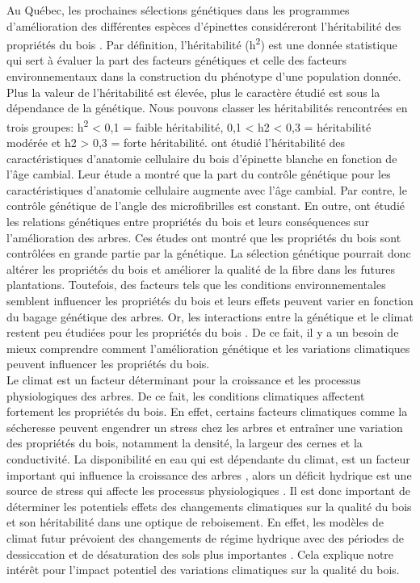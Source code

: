 \documentclass[a4paper,12pt]{report}
\begin{document}
Au Québec, les prochaines sélections génétiques dans les programmes d'amélioration des différentes espèces d'épinettes considéreront l'héritabilité des propriétés du bois \citep{Mullin2011, Beaulieu2009}. Par définition, l'héritabilité (h\textsuperscript{2}) est une donnée statistique qui sert à évaluer la part des facteurs génétiques et celle des facteurs environnementaux dans la construction du phénotype d'une population donnée. Plus la valeur de l'héritabilité est élevée, plus le caractère étudié est sous la dépendance de la génétique. Nous pouvons classer les héritabilités rencontrées en trois groupes: h\textsuperscript{2} < 0,1 = faible héritabilité, 0,1 < h2 < 0,3 = héritabilité modérée et h2 > 0,3 = forte héritabilité. \cite{Lenz2010} ont étudié l'héritabilité des caractéristiques d'anatomie cellulaire du bois d'épinette blanche en fonction de l'âge cambial. Leur étude a montré que la part du contrôle génétique pour les caractéristiques d'anatomie cellulaire augmente avec l'âge cambial. Par contre, le contrôle génétique de l'angle des microfibrilles est constant. En outre, \cite{Lenz2011} ont étudié les relations génétiques entre propriétés du bois et leurs conséquences sur l'amélioration des arbres. Ces études ont montré que les propriétés du bois sont contrôlées en grande partie par la génétique. La sélection génétique pourrait donc altérer les propriétés du bois et améliorer la qualité de la fibre dans les futures plantations. Toutefois, des facteurs tels que les conditions environnementales semblent influencer les propriétés du bois et leurs effets peuvent varier en fonction du bagage génétique des arbres. Or, les interactions entre la génétique et le climat restent peu étudiées pour les propriétés du bois \citep{Housset2018}. De ce fait, il y a un besoin de mieux comprendre comment l'amélioration génétique et les variations climatiques peuvent influencer les propriétés du bois. \\

Le climat est un facteur déterminant pour la croissance et les processus physiologiques des arbres. De ce fait, les conditions climatiques affectent fortement les propriétés du bois. En effet, certains facteurs climatiques comme la sécheresse peuvent engendrer un stress chez les arbres et entraîner une variation des propriétés du bois, notamment la densité, la largeur des cernes et la conductivité. La disponibilité en eau qui est dépendante du climat, est un facteur important qui influence la croissance des arbres \citep{Lebourgeois2005}, alors un déficit hydrique est une source de stress qui affecte les processus physiologiques \citep{Waring1987}. Il est donc important de déterminer les potentiels effets des changements climatiques sur la qualité du bois et son héritabilité dans une optique de reboisement. En effet, les modèles de climat futur prévoient des changements de régime hydrique avec des périodes de dessiccation et de désaturation des sols plus importantes \citep{IPCC_2015}. Cela explique notre intérêt pour l'impact potentiel des variations climatiques sur la qualité du bois. \\
\end{document}
